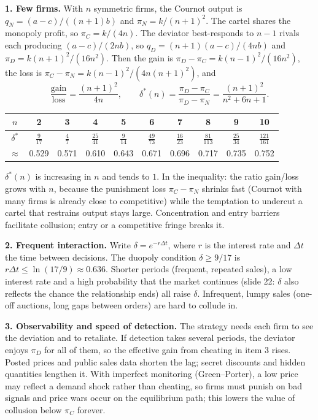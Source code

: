 \documentclass[11pt,a4paper]{article}
\begin{document}
\textbf{1. Few firms.} With $n$ symmetric firms, the Cournot output is $q_N = (a-c)/((n+1)b)$ and
$\pi_N = k/(n+1)^2$. The cartel shares the monopoly profit, so $\pi_C = k/(4n)$. The deviator best-responds
to $n-1$ rivals each producing $(a-c)/(2nb)$, so $q_D = (n+1)(a-c)/(4nb)$ and
$\pi_D = k(n+1)^2/(16n^2)$. Then the gain is $\pi_D - \pi_C = k(n-1)^2/(16n^2)$, the loss is
$\pi_C - \pi_N = k(n-1)^2/(4n(n+1)^2)$, and
\[
\frac{\text{gain}}{\text{loss}} = \frac{(n+1)^2}{4n}, \qquad
\delta^*(n) = \frac{\pi_D - \pi_C}{\pi_D - \pi_N} = \frac{(n+1)^2}{n^2 + 6n + 1}.
\]
\begin{center}
\begin{tabular}{c|ccccccccc}
$n$ & 2 & 3 & 4 & 5 & 6 & 7 & 8 & 9 & 10\\\hline
$\delta^*$ & $\frac{9}{17}$ & $\frac{4}{7}$ & $\frac{25}{41}$ & $\frac{9}{14}$ & $\frac{49}{73}$ &
$\frac{16}{23}$ & $\frac{81}{113}$ & $\frac{25}{34}$ & $\frac{121}{161}$\\
$\approx$ & 0.529 & 0.571 & 0.610 & 0.643 & 0.671 & 0.696 & 0.717 & 0.735 & 0.752
\end{tabular}
\end{center}
$\delta^*(n)$ is increasing in $n$ and tends to $1$. In the inequality: the ratio gain/loss grows with
$n$, because the punishment loss $\pi_C - \pi_N$ shrinks fast (Cournot with many firms is already close
to competitive) while the temptation to undercut a cartel that restrains output stays large. Concentration
and entry barriers facilitate collusion; entry or a competitive fringe breaks it.

\textbf{2. Frequent interaction.} Write $\delta = e^{-r\Delta t}$, where $r$ is the interest rate and
$\Delta t$ the time between decisions. The duopoly condition $\delta \ge 9/17$ is
$r\Delta t \le \ln(17/9) \approx 0.636$. Shorter periods (frequent, repeated sales), a low interest rate
and a high probability that the market continues (slide 22: $\delta$ also reflects the chance the
relationship ends) all raise $\delta$. Infrequent, lumpy sales (one-off auctions, long gaps between
orders) are hard to collude in.

\textbf{3. Observability and speed of detection.} The strategy needs each firm to see the deviation
and to retaliate. If detection takes several periods, the deviator enjoys $\pi_D$ for all of them, so
the effective gain from cheating in item 3 rises. Posted prices and public sales data shorten the lag;
secret discounts and hidden quantities lengthen it. With imperfect monitoring (Green--Porter), a low price may
reflect a demand shock rather than cheating, so firms must punish on bad signals and price wars occur
on the equilibrium path; this lowers the value of collusion below $\pi_C$ forever.
\end{document}
